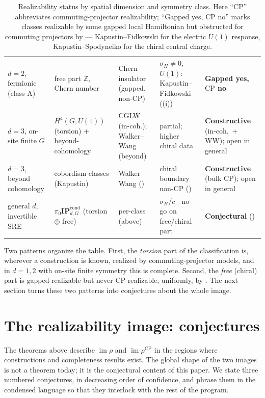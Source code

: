 \documentclass[12pt]{article}
\newcommand{\IPcond}{\mathbf{IP}^{\mathrm{cond}}}  %
\newcommand{\real}{\rho}                         %
\newcommand{\CP}{\mathrm{CP}}                    %
\newcommand{\Zint}{\mathbb{Z}}
\newcommand{\im}{\operatorname{im}}
\theoremstyle{definition}
\theoremstyle{remark}
\begin{document}
\begin{table}[htbp]
\begin{tabular}{@{}L{0.13\textwidth}L{0.18\textwidth}L{0.17\textwidth}L{0.21\textwidth}L{0.22\textwidth}@{}}
$d=2$, fermionic (class A) &
free part $\Zint$, Chern number &
Chern insulator (gapped, non-$\CP$) &
$\sigma_H\ne0$, $U(1)$: Kapustin--Fidkowski ((i)) &
\textbf{Gapped yes, $\CP$ no} \\

$d=3$, on-site finite $G$ &
$H^4(G,U(1))$ (torsion) + beyond-cohomology &
CGLW (in-coh.); Walker--Wang (beyond) &
partial; higher chiral data &
\textbf{Constructive} (in-coh.\ + WW); open in general \\

$d=3$, beyond cohomology &
cobordism classes (Kapustin) &
Walker--Wang () &
chiral boundary non-$\CP$ () &
\textbf{Constructive} (bulk $\CP$); open in general \\

general $d$, invertible SRE &
$\pi_0\IPcond_{d,G}$ (torsion $\oplus$ free) &
per-class (above) &
$\sigma_H$/$c_-$ no-go on free/chiral part &
\textbf{Conjectural} () \\
\bottomrule
\end{tabular}
\caption{Realizability status by spatial dimension and symmetry class. Here ``$\CP$''
abbreviates commuting-projector realizability; ``Gapped yes, $\CP$ no'' marks classes
realizable by some gapped local Hamiltonian but obstructed for commuting projectors by
 --- Kapustin--Fidkowski for the electric $U(1)$ response, Kapustin--Spodyneiko
for the chiral central charge.}
\label{tab:status}
\end{table}

Two patterns organize the table. First, the \emph{torsion} part of the classification is,
wherever a construction is known, realized by commuting-projector models, and in $d=1,2$ with
on-site finite symmetry this is complete. Second, the \emph{free} (chiral) part is
gapped-realizable but never $\CP$-realizable, uniformly, by . The next section
turns these two patterns into conjectures about the whole image.

\section{The realizability image: conjectures}
\label{sec:image}

The theorems above describe $\im\real$ and $\im\real^{\CP}$ in the regions where
constructions and completeness results exist. The global shape of the two images is not a
theorem today; it is the conjectural content of this paper. We state three numbered
conjectures, in decreasing order of confidence, and phrase them in the condensed language so
that they interlock with the rest of the program.
\end{document}
